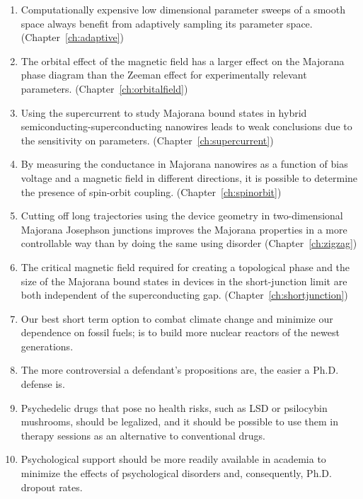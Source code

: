 \documentclass{dissertation}
\begin{document}
\begin{enumerate}

\item Computationally expensive low dimensional parameter sweeps of a smooth space always benefit from adaptively sampling its parameter space. (Chapter~\ref{ch:adaptive})

\item The orbital effect of the magnetic field has a larger effect on the Majorana phase diagram than the Zeeman effect for experimentally relevant parameters. (Chapter~\ref{ch:orbitalfield})

\item Using the supercurrent to study Majorana bound states in hybrid semiconducting-superconducting nanowires leads to weak conclusions due to the sensitivity on parameters. (Chapter~\ref{ch:supercurrent})

\item By measuring the conductance in Majorana nanowires as a function of bias voltage and a magnetic field in different directions, it is possible to determine the presence of spin-orbit coupling. (Chapter~\ref{ch:spinorbit})

\item Cutting off long trajectories using the device geometry in two-dimensional Majorana Josephson junctions improves the Majorana properties in a more controllable way than by doing the same using disorder (Chapter~\ref{ch:zigzag})

\item The critical magnetic field required for creating a topological phase and the size of the Majorana bound states in devices in the short-junction limit are both independent of the superconducting gap. (Chapter~\ref{ch:shortjunction})

\item Our best short term option to combat climate change and minimize our dependence on fossil fuels; is to build more nuclear reactors of the newest generations.

\item The more controversial a defendant's propositions are, the easier a Ph.D. defense is.

\item Psychedelic drugs that pose no health risks, such as LSD or psilocybin mushrooms, should be legalized, and it should be possible to use them in therapy sessions as an alternative to conventional drugs.

\item Psychological support should be more readily available in academia to minimize the effects of psychological disorders and, consequently, Ph.D. dropout rates.


\end{enumerate}
\end{document}
